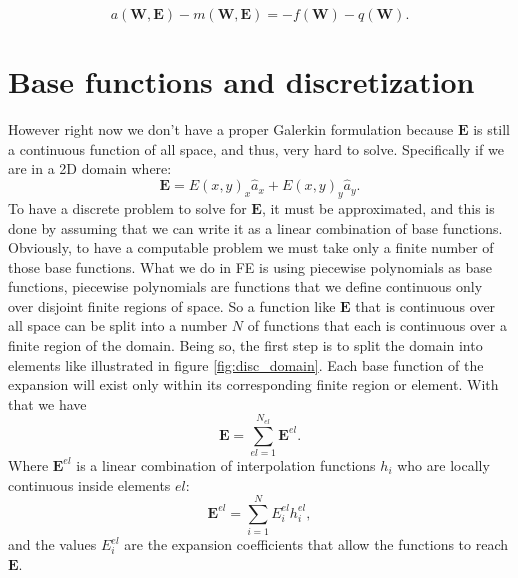 \begin{equation}
a(\mathbf{W},\mathbf{E}) - m(\mathbf{W},\mathbf{E}) = -f(\mathbf{W})-q(\mathbf{W})
\label{eq:abstract_E_wave}.
\end{equation}

\section{Base functions and discretization}
However right now we don't have a proper Galerkin formulation because $\mathbf{E}$ is still a continuous function of all space, and thus, very hard to solve. Specifically if we are in a 2D domain where:
\[\mathbf{E}=E(x,y)_x\hat{a}_x + E(x,y)_y \hat{a}_y. \]
To have a discrete problem to solve for $\mathbf{E}$, it must be approximated, and this is done by assuming that we can write it as a linear combination of base functions. Obviously,  to have a computable problem we must take only a finite number of those base functions. What we do in FE is using piecewise polynomials as base functions, piecewise polynomials are functions that we define continuous only over disjoint finite regions of space. So a function like $\mathbf{E}$ that is continuous over all space can be split into a number $N$ of functions that each is continuous over a finite region of the domain. 
Being so, the first step is to split the domain into elements like illustrated in figure \ref{fig:disc_domain}. Each base function of the expansion will exist only within its corresponding finite region or element. With that we have
\begin{equation}
\mathbf{E} = \sum_{el=1}^{N_{el}}\mathbf{E}^{el}.
\end{equation}
Where $\mathbf{E}^{el}$ is a linear combination of interpolation functions $h_i$ who are locally continuous inside elements $el$:
\begin{equation}
\mathbf{E}^{el} = \sum_{i =1}^N E_i^{el}h_i^{el},
\end{equation}
and the values $E_i^{el}$ are the expansion coefficients that allow the functions to reach $\mathbf{E}$.
